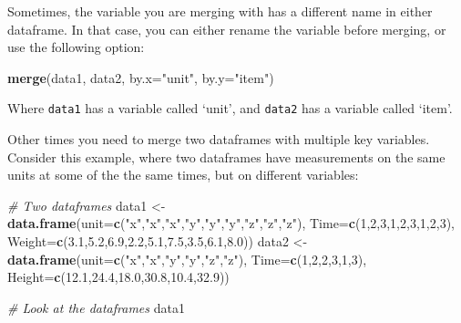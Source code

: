 \documentclass[]{book}
\newenvironment{Shaded}{\begin{snugshade}}{\end{snugshade}}
\newcommand{\CommentTok}[1]{\textcolor[rgb]{0.56,0.35,0.01}{\textit{#1}}}
\newcommand{\DataTypeTok}[1]{\textcolor[rgb]{0.13,0.29,0.53}{#1}}
\newcommand{\DecValTok}[1]{\textcolor[rgb]{0.00,0.00,0.81}{#1}}
\newcommand{\FloatTok}[1]{\textcolor[rgb]{0.00,0.00,0.81}{#1}}
\newcommand{\KeywordTok}[1]{\textcolor[rgb]{0.13,0.29,0.53}{\textbf{#1}}}
\newcommand{\NormalTok}[1]{#1}
\newcommand{\StringTok}[1]{\textcolor[rgb]{0.31,0.60,0.02}{#1}}
\begin{document}
Sometimes, the variable you are merging with has a different name in either dataframe. In that case, you can either rename the variable before merging, or use the following option:

\begin{Shaded}
\begin{Highlighting}[]
\KeywordTok{merge}\NormalTok{(data1, data2, }\DataTypeTok{by.x=}\StringTok{"unit"}\NormalTok{, }\DataTypeTok{by.y=}\StringTok{"item"}\NormalTok{)}
\end{Highlighting}
\end{Shaded}

Where \texttt{data1} has a variable called `unit', and \texttt{data2} has a variable called `item'.

Other times you need to merge two dataframes with multiple key variables. Consider this example, where two dataframes have measurements on the same units at some of the the same times, but on different variables:

\begin{Shaded}
\begin{Highlighting}[]
\CommentTok{# Two dataframes}
\NormalTok{data1 <-}\StringTok{ }\KeywordTok{data.frame}\NormalTok{(}\DataTypeTok{unit=}\KeywordTok{c}\NormalTok{(}\StringTok{"x"}\NormalTok{,}\StringTok{"x"}\NormalTok{,}\StringTok{"x"}\NormalTok{,}\StringTok{"y"}\NormalTok{,}\StringTok{"y"}\NormalTok{,}\StringTok{"y"}\NormalTok{,}\StringTok{"z"}\NormalTok{,}\StringTok{"z"}\NormalTok{,}\StringTok{"z"}\NormalTok{),}
\DataTypeTok{Time=}\KeywordTok{c}\NormalTok{(}\DecValTok{1}\NormalTok{,}\DecValTok{2}\NormalTok{,}\DecValTok{3}\NormalTok{,}\DecValTok{1}\NormalTok{,}\DecValTok{2}\NormalTok{,}\DecValTok{3}\NormalTok{,}\DecValTok{1}\NormalTok{,}\DecValTok{2}\NormalTok{,}\DecValTok{3}\NormalTok{),}
\DataTypeTok{Weight=}\KeywordTok{c}\NormalTok{(}\FloatTok{3.1}\NormalTok{,}\FloatTok{5.2}\NormalTok{,}\FloatTok{6.9}\NormalTok{,}\FloatTok{2.2}\NormalTok{,}\FloatTok{5.1}\NormalTok{,}\FloatTok{7.5}\NormalTok{,}\FloatTok{3.5}\NormalTok{,}\FloatTok{6.1}\NormalTok{,}\FloatTok{8.0}\NormalTok{))}
\NormalTok{data2 <-}\StringTok{ }\KeywordTok{data.frame}\NormalTok{(}\DataTypeTok{unit=}\KeywordTok{c}\NormalTok{(}\StringTok{"x"}\NormalTok{,}\StringTok{"x"}\NormalTok{,}\StringTok{"y"}\NormalTok{,}\StringTok{"y"}\NormalTok{,}\StringTok{"z"}\NormalTok{,}\StringTok{"z"}\NormalTok{),}
\DataTypeTok{Time=}\KeywordTok{c}\NormalTok{(}\DecValTok{1}\NormalTok{,}\DecValTok{2}\NormalTok{,}\DecValTok{2}\NormalTok{,}\DecValTok{3}\NormalTok{,}\DecValTok{1}\NormalTok{,}\DecValTok{3}\NormalTok{),}
\DataTypeTok{Height=}\KeywordTok{c}\NormalTok{(}\FloatTok{12.1}\NormalTok{,}\FloatTok{24.4}\NormalTok{,}\FloatTok{18.0}\NormalTok{,}\FloatTok{30.8}\NormalTok{,}\FloatTok{10.4}\NormalTok{,}\FloatTok{32.9}\NormalTok{))}

\CommentTok{# Look at the dataframes}
\NormalTok{data1}
\end{Highlighting}
\end{Shaded}
\end{document}
